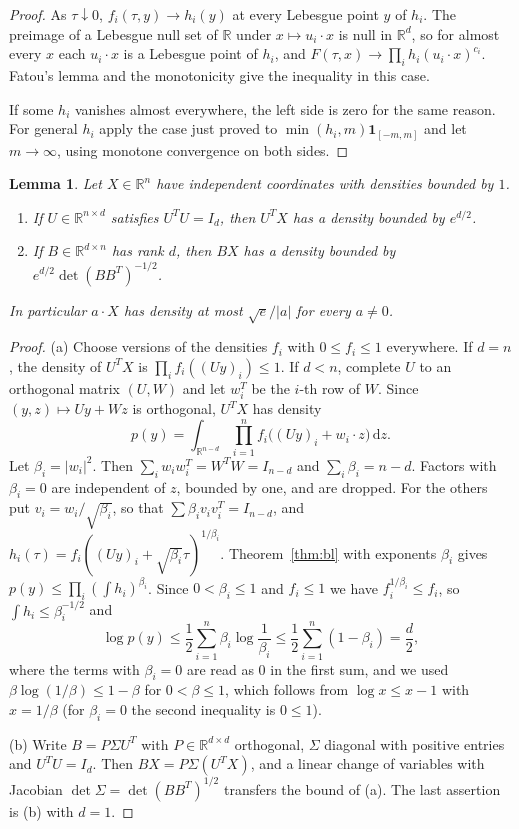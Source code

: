 \documentclass[11pt]{amsart}
\numberwithin{equation}{section}
\newtheorem{lemma}[theorem]{Lemma}
\theoremstyle{definition}
\theoremstyle{remark}
\newcommand{\R}{\mathbb R}
\newcommand{\1}{\mathbf 1}
\newcommand{\dd}{\,\mathrm d}
\newcommand{\abs}[1]{\lvert #1\rvert}
\begin{document}
\begin{proof}
As $\tau\downarrow0$, $f_i(\tau,y)\to h_i(y)$ at every Lebesgue point $y$ of $h_i$. The preimage of a Lebesgue null set of $\R$ under $x\mapsto u_i\cdot x$ is null in $\R^d$, so for almost every $x$ each $u_i\cdot x$ is a Lebesgue point of $h_i$, and $F(\tau,x)\to\prod_ih_i(u_i\cdot x)^{c_i}$. Fatou's lemma and the monotonicity give the inequality in this case.

If some $h_i$ vanishes almost everywhere, the left side is zero for the same reason. For general $h_i$ apply the case just proved to $\min(h_i,m)\1_{[-m,m]}$ and let $m\to\infty$, using monotone convergence on both sides.
\end{proof}

\begin{lemma}\label{lem:projection}
Let $X\in\R^n$ have independent coordinates with densities bounded by $1$.
\begin{enumerate}
\item[(a)] If $U\in\R^{n\times d}$ satisfies $U^TU=I_d$, then $U^TX$ has a density bounded by $e^{d/2}$.
\item[(b)] If $B\in\R^{d\times n}$ has rank $d$, then $BX$ has a density bounded by $e^{d/2}\det(BB^T)^{-1/2}$.
\end{enumerate}
In particular $a\cdot X$ has density at most $\sqrt e/\abs a$ for every $a\ne0$.
\end{lemma}

\begin{proof}
(a) Choose versions of the densities $f_i$ with $0\le f_i\le1$ everywhere. If $d=n$, the density of $U^TX$ is $\prod_if_i((Uy)_i)\le1$. If $d<n$, complete $U$ to an orthogonal matrix $(U,W)$ and let $w_i^T$ be the $i$-th row of $W$. Since $(y,z)\mapsto Uy+Wz$ is orthogonal, $U^TX$ has density
\[
p(y)=\int_{\R^{n-d}}\prod_{i=1}^nf_i\bigl((Uy)_i+w_i\cdot z\bigr)\dd z .
\]
Let $\beta_i=\abs{w_i}^2$. Then $\sum_iw_iw_i^T=W^TW=I_{n-d}$ and $\sum_i\beta_i=n-d$. Factors with $\beta_i=0$ are independent of $z$, bounded by one, and are dropped. For the others put $v_i=w_i/\sqrt{\beta_i}$, so that $\sum\beta_iv_iv_i^T=I_{n-d}$, and $h_i(\tau)=f_i((Uy)_i+\sqrt{\beta_i}\tau)^{1/\beta_i}$. Theorem~\ref{thm:bl} with exponents $\beta_i$ gives $p(y)\le\prod_i(\int h_i)^{\beta_i}$. Since $0<\beta_i\le1$ and $f_i\le1$ we have $f_i^{1/\beta_i}\le f_i$, so $\int h_i\le\beta_i^{-1/2}$ and
\[
\log p(y)\le\frac12\sum_{i=1}^n\beta_i\log\frac1{\beta_i}\le\frac12\sum_{i=1}^n(1-\beta_i)=\frac d2,
\]
where the terms with $\beta_i=0$ are read as $0$ in the first sum, and we used $\beta\log(1/\beta)\le1-\beta$ for $0<\beta\le1$, which follows from $\log x\le x-1$ with $x=1/\beta$ (for $\beta_i=0$ the second inequality is $0\le1$).

(b) Write $B=P\Sigma U^T$ with $P\in\R^{d\times d}$ orthogonal, $\Sigma$ diagonal with positive entries and $U^TU=I_d$. Then $BX=P\Sigma(U^TX)$, and a linear change of variables with Jacobian $\det\Sigma=\det(BB^T)^{1/2}$ transfers the bound of (a). The last assertion is (b) with $d=1$.
\end{proof}
\end{document}
